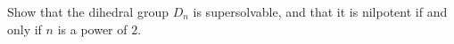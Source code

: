Show that the dihedral group $D_n$ is supersolvable, and that it is nilpotent if and only if $n$ is a power of $2$.
